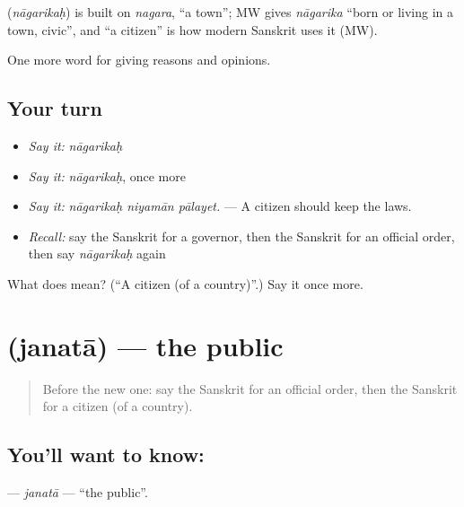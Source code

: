 \begin{cousinweb}
\textbf{} (\emph{nāgarikaḥ}) is built on \emph{nagara}, \textquotedblleft{}a town\textquotedblright{}; MW gives \emph{nāgarika} \textquotedblleft{}born or living in a town, civic\textquotedblright{}, and \textquotedblleft{}a citizen\textquotedblright{} is how modern Sanskrit uses it (MW).
\end{cousinweb}

\begin{grammarlens}[title={What you've built}]
One more word for giving reasons and opinions.
\end{grammarlens}

\subsection*{Your turn}
\begin{itemize}
\raggedright
  \item \emph{Say it:} \emph{nāgarikaḥ}
  \item \emph{Say it:} \emph{nāgarikaḥ}, once more
  \item \emph{Say it:} \emph{nāgarikaḥ niyamān pālayet.} — A citizen should keep the laws.
  \item \emph{Recall:} say the Sanskrit for a governor, then the Sanskrit for an official order, then say \emph{nāgarikaḥ} again
\end{itemize}

\begin{tcolorbox}[breakable,colback=teal!4,colframe=teal!35!black,title={Before you move on}]
What does  mean? (\textquotedblleft{}A citizen (of a country)\textquotedblright{}.) Say it once more.
\end{tcolorbox}
\section[\texorpdfstring{\sk{जनता} (janatā)}{जनता (janatā)}]{ (janatā) — the public}

\label{lesson:SA-C354-janata}



\begin{quote}
Before the new one: say the Sanskrit for an official order, then the Sanskrit for a citizen (of a country).
\end{quote}

\subsection*{You'll want to know: }
\textbf{} — \emph{janatā} — \textquotedblleft{}the public\textquotedblright{}.

